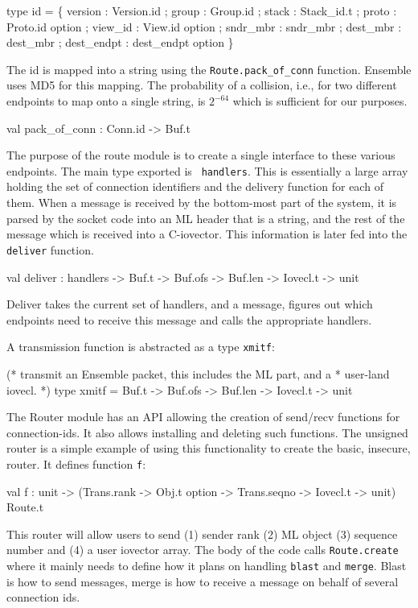 \begin{codebox}
type id = \{
  version       : Version.id ;
  group 	: Group.id ;
  stack 	: Stack_id.t ;
  proto 	: Proto.id option ;
  view_id 	: View.id option ;
  sndr_mbr 	: sndr_mbr ;
  dest_mbr 	: dest_mbr ;
  dest_endpt 	: dest_endpt option
\}
\end{codebox}

The id is mapped into a string using the {\tt Route.pack\_of\_conn}
function. Ensemble uses MD5 for this mapping. The probability of a
collision, i.e., for two different endpoints to map onto a single
string, is $2^{-64}$ which is sufficient for our purposes. 

\begin{codebox}
val pack_of_conn : Conn.id -> Buf.t
\end{codebox}

The purpose of the route module is to create a single interface to
these various endpoints. The main type exported is {\tt
handlers}. This is essentially a large array holding the set of
connection identifiers and the delivery function for each of
them. When a message is received by the bottom-most part of the
system, it is parsed by the socket code into an ML header that is a
string, and the rest of the message which is received into a
C-iovector. This information is later fed into the {\tt deliver}
function.

\begin{codebox}
val deliver : handlers -> Buf.t -> Buf.ofs -> Buf.len -> Iovecl.t -> unit
\end{codebox}

Deliver takes the current set of handlers, and a message, figures out
which endpoints need to receive this message and calls the appropriate
handlers. 

A transmission function is abstracted as a type {\tt xmitf}:
\begin{codebox}
(* transmit an Ensemble packet, this includes the ML part, and a
 * user-land iovecl.
 *)
type xmitf = Buf.t -> Buf.ofs -> Buf.len -> Iovecl.t -> unit
\end{codebox}

The Router module has an API allowing the creation of send/recv
functions for connection-ids. It also allows installing and deleting
such functions. The unsigned router is a simple example of
using this functionality to create the basic, insecure,
router. It defines function {\tt f}: 
\begin{codebox}
val f : unit -> 
  (Trans.rank -> Obj.t option -> Trans.seqno -> Iovecl.t -> unit) Route.t
\end{codebox}

This router will allow users to send (1) sender rank (2) ML object (3)
sequence number and (4) a user iovector array. The body of the code
calls {\tt Route.create} where it mainly needs to define how it plans
on handling {\tt blast} and {\tt merge}. Blast is how to send
messages, merge is how to receive a message on behalf of several
connection ids. 

